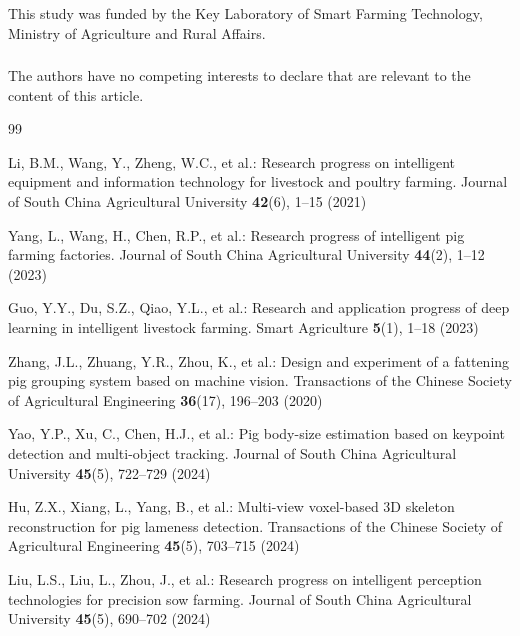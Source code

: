 \documentclass[runningheads]{llncs}
\begin{document}
\begin{credits}
\subsubsection{\ackname}
This study was funded by the Key Laboratory of Smart Farming Technology, Ministry of Agriculture and Rural Affairs.

\subsubsection{\discintname}
The authors have no competing interests to declare that are relevant to the content of this article.
\end{credits}

\begin{thebibliography}{99}

Li, B.M., Wang, Y., Zheng, W.C., et al.: Research progress on intelligent equipment and information technology for livestock and poultry farming. Journal of South China Agricultural University \textbf{42}(6), 1--15 (2021)

Yang, L., Wang, H., Chen, R.P., et al.: Research progress of intelligent pig farming factories. Journal of South China Agricultural University \textbf{44}(2), 1--12 (2023)

Guo, Y.Y., Du, S.Z., Qiao, Y.L., et al.: Research and application progress of deep learning in intelligent livestock farming. Smart Agriculture \textbf{5}(1), 1--18 (2023)

Zhang, J.L., Zhuang, Y.R., Zhou, K., et al.: Design and experiment of a fattening pig grouping system based on machine vision. Transactions of the Chinese Society of Agricultural Engineering \textbf{36}(17), 196--203 (2020)

Yao, Y.P., Xu, C., Chen, H.J., et al.: Pig body-size estimation based on keypoint detection and multi-object tracking. Journal of South China Agricultural University \textbf{45}(5), 722--729 (2024)

Hu, Z.X., Xiang, L., Yang, B., et al.: Multi-view voxel-based 3D skeleton reconstruction for pig lameness detection. Transactions of the Chinese Society of Agricultural Engineering \textbf{45}(5), 703--715 (2024)

Liu, L.S., Liu, L., Zhou, J., et al.: Research progress on intelligent perception technologies for precision sow farming. Journal of South China Agricultural University \textbf{45}(5), 690--702 (2024)


\end{thebibliography}
\end{document}
